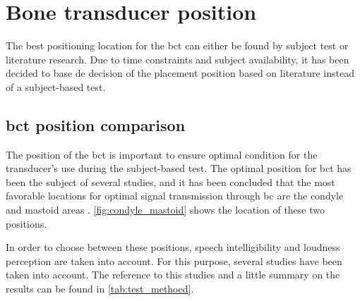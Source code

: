 \section{Bone transducer position}
\label{sec:bc_pos}

The best positioning location for the \gls{bct} can either be found by subject test or literature research. Due to time constraints and subject availability, it has been decided to base de decision of the placement position based on literature instead of a subject-based test.

\subsection{\gls{bct} position comparison}
The position of the \gls{bct} is important to ensure optimal condition for the transducer's use during  the subject-based test. The optimal position for \gls{bct} has been the subject of several studies, and it has been concluded that the most favorable locations for optimal signal transmission through \gls{bc} are the condyle and mastoid areas \citep{cat_test}. \autoref{fig:condyle_mastoid} shows the location of these two positions.


In order to choose between these positions, speech intelligibility and loudness perception are taken into account. For this purpose, several studies have been taken into account. The reference to this studies and a little summary on the results can be found in  \autoref{tab:test_methoed}.

